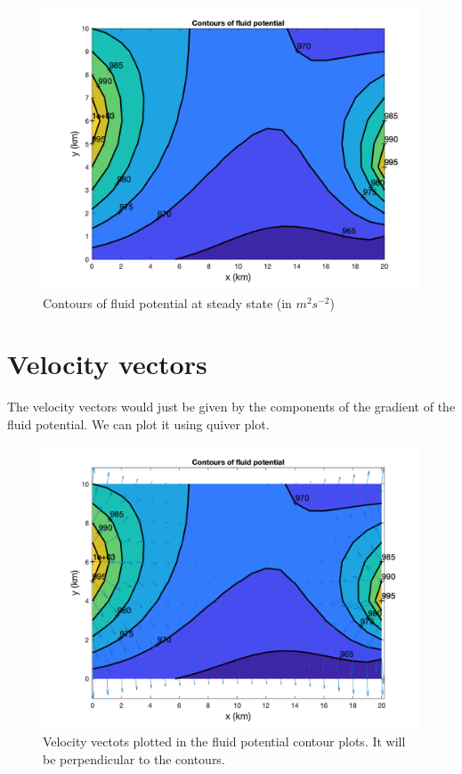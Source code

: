 \documentclass{article}
\begin{document}
\begin{figure}
    \centering
    \includegraphics[scale=0.3]{1.png}
    \caption{Contours of fluid potential at steady state (in $m^2s^{-2}$)}
\end{figure}

\section{Velocity vectors}

The velocity vectors would just be given by the components of the gradient of the fluid potential. We can plot it using quiver plot.
\begin{figure}
    \centering
    \includegraphics[scale=0.3]{3.png}
    \caption{Velocity vectots plotted in the fluid potential contour plots. It will be perpendicular to the contours.}
\end{figure}
\end{document}
